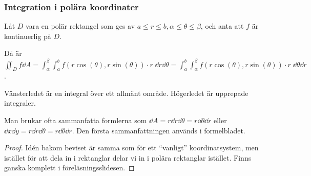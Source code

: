 \documentclass[a4paper]{article}
\begin{document}
\subsubsection{Integration i polära koordinater}
\begin{sats}
    Låt \(
        D 
    \) vara en polär rektangel som ges av \(
        a \leq r \leq b, 
        \alpha \leq \theta \leq \beta
    \), och anta att \(
        f 
    \) är kontinuerlig på \(
        D
    \).

    Då är \(
        \iint_D f \dd A = \int_\alpha^\beta \int_a^b f(r\cos(\theta), r\sin(\theta)) \cdot r \; \dd r \dd \theta
        = \int_a^b \int_\alpha^\beta f(r\cos(\theta), r\sin(\theta)) \cdot r \; \dd \theta \dd r
    \).

    \begin{obs}
        Vänsterledet är en integral över ett allmänt område. 
        Högerledet är upprepade integraler.
    \end{obs}

    Man brukar ofta sammanfatta formlerna som \(
        \dd A = r \dd r \dd \theta = r \dd \theta \dd r
    \) eller \(
        \dd x \dd y = r \dd r \dd \theta = r \dd \theta \dd r
    \). Den första sammanfattningen används i formelbladet.

    \begin{proof}
        Idén bakom beviset är samma som för ett \enquote{vanligt} 
        koordinatsystem, men istället för att dela in i rektanglar delar vi 
        in i polära rektanglar istället. Finns ganska komplett i 
        föreläsningsslidesen.
    \end{proof}
\end{sats}
\end{document}
